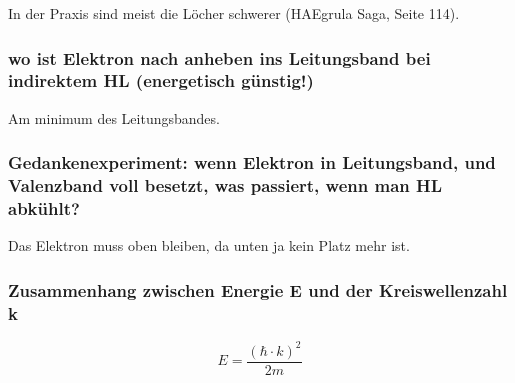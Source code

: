In der Praxis sind meist die Löcher schwerer (HAEgrula Saga, Seite 114).
\subsubsection{wo ist Elektron nach anheben ins Leitungsband bei indirektem HL (energetisch günstig!)}
Am minimum des Leitungsbandes.
\subsubsection{Gedankenexperiment: wenn Elektron in Leitungsband, und Valenzband voll besetzt, was passiert, wenn man HL abkühlt?}
Das Elektron muss oben bleiben, da unten ja kein Platz mehr ist.
\subsubsection{Zusammenhang zwischen Energie E und der Kreiswellenzahl k}
\begin{equation}
    E = \frac{(\hbar \cdot k)^2}{2m}
\end{equation}